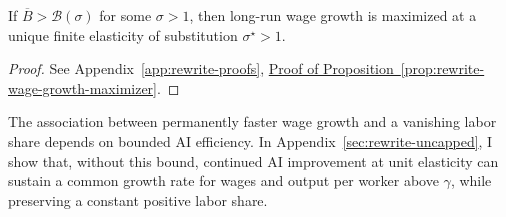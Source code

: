 \begin{proposition}
\label{prop:rewrite-wage-growth-maximizer}
If $\overline B>\mathcal B(\sigma)$ for some $\sigma>1$, then long-run
wage growth is maximized at a unique finite elasticity of substitution
$\sigma^\star>1$.
\end{proposition}
\begin{proof}
See Appendix~\ref{app:rewrite-proofs},
\hyperref[proof:rewrite-wage-growth-maximizer]{Proof of
Proposition~\ref*{prop:rewrite-wage-growth-maximizer}}.
\end{proof}



The association between permanently faster wage growth and a vanishing labor share depends on bounded AI efficiency. In Appendix~\ref{sec:rewrite-uncapped}, I show that, without this bound, continued AI improvement at unit elasticity can sustain a common growth rate for wages and output per worker above $\gamma$, while preserving a constant positive labor share.
